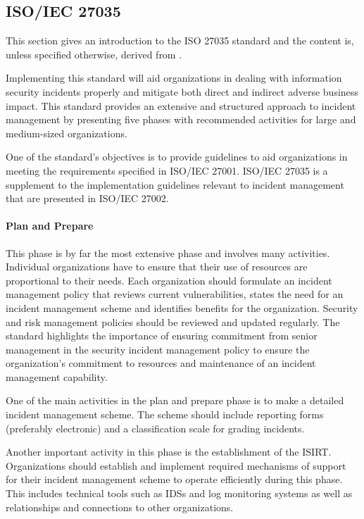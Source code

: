 \subsection{\acs{ISO}/\acs{IEC} 27035}
\label{sec:iso27035}
This section gives an introduction to the ISO 27035 standard and the content is, unless specified otherwise, derived from \cite{ISO/IEC27035}. 

Implementing this standard will aid organizations in dealing with information security incidents properly and mitigate both direct and indirect adverse business impact. This standard provides an extensive and structured approach to incident management by presenting five phases with recommended activities for large and medium-sized organizations. 

One of the standard's objectives is to provide guidelines to aid organizations in meeting the requirements specified in ISO/IEC 27001. ISO/IEC 27035 is a supplement to the implementation guidelines relevant to incident management that are presented in ISO/IEC 27002.

\paragraph{Plan and Prepare} This phase is by far the most extensive phase and involves many activities. Individual organizations have to ensure that their use of resources are proportional to their needs. Each organization should formulate an incident management policy that reviews current vulnerabilities, states the need for an incident management scheme and identifies benefits for the organization. Security and risk management policies should be reviewed and updated regularly. The standard highlights the importance of ensuring commitment from senior management in the security incident management policy to ensure the organization's commitment to resources and maintenance of an incident management capability.  

One of the main activities in the plan and prepare phase is to make a detailed incident management scheme. The scheme should include reporting forms (preferably electronic) and a classification scale for grading incidents.   

Another important activity in this phase is the establishment of the \acf{ISIRT}. Organizations should establish and implement required mechanisms of support for their incident management scheme to operate efficiently during this phase. This includes technical tools such as \acp{IDS} and log monitoring systems as well as relationships and connections to other organizations. 

